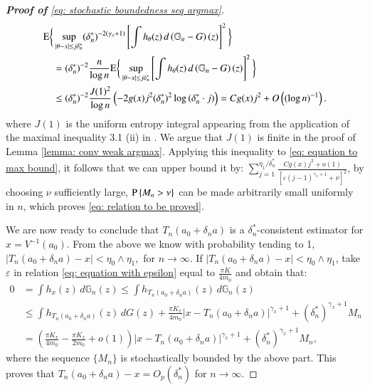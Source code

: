 \begin{proof}[\hypertarget{proof of lemma 3}{\textbf{Proof of}} \eqref{eq: stochastic boundedness seq argmax}]
\begin{align*}
&\mathrm{E} \bigg\{\sup _{|\theta-x| \leq j \delta^*_n} (\delta^*_n)^{-2(\gamma_x+ 1)}\left[\int h_\theta(z) \, d\left(\mathbb{G}_n-G\right)(z)\right]^2\bigg\}  \\
& \quad = (\delta^*_n)^{-2} \frac{n}{\log{n}} \mathrm{E} \bigg\{\sup _{|\theta-x| \leq j \delta^*_n} \left[\int h_\theta(z) \, d\left(\mathbb{G}_n-G\right)(z)\right]^2\bigg\}  \\
& \quad \leq (\delta^*_n)^{-2} \frac{J(1)^2}{\log{n}} \left( -2 g(x) j^2 (\delta^*_n)^2\log{(\delta^*_n \cdot j)}\right) =  C g(x) j^2 + O\left( (\log{n})^{-1} \right).
\end{align*}
where $J(1)$ is the uniform entropy integral appearing from the application of the maximal inequality 3.1 (ii) in \cite{12}. We argue that $J(1)$ is finite in the proof of Lemma \ref{lemma: conv weak argmax}. Applying this inequality to \eqref{eq: equation to max bound}, it follows that we can upper bound it by: $\sum_{j=1}^{\eta_1 / \delta^*_n} \frac{C g(x) j^2 + o(1)}{\left[\varepsilon(j-1)^{\gamma_x+ 1}+\nu\right]^2}$,
by choosing $\nu$ sufficiently large, $\mathrm{P}\left\{M_n>\nu\right\}$ can be made arbitrarily small uniformly in $n$, which proves \eqref{eq: relation to be proved}. 

We are now ready to conclude that $T_n\left(a_0 + \delta_n a \right)$ is a $\delta^*_n$-consistent estimator for $x=V^{-1}\left(a_0\right)$. From the above we know with probability tending to 1, $\left|T_n\left(a_0 + \delta_n a \right)-x\right|<\eta_0 \wedge \eta_1,$
for $n \rightarrow \infty$. If $\left|T_n\left(a_0 + \delta_n a \right)-x\right|<\eta_0 \wedge \eta_1$, take $\varepsilon$ in relation \eqref{eq: equation with epsilon} equal to $\frac{\pi K}{4 m_0}$ and obtain that:
\begin{align*}
0 & =\int h_x(z) \, d \mathbb{G}_n(z) \leq \int h_{T_n\left(a_0 + \delta_n a\right)}(z) \, d \mathbb{G}_n(z) \\
& \leq \int h_{T_n\left(a_0 + \delta_n a \right)}(z) \, d G(z)+\frac{\pi K_x}{4 m_0}\left|x-T_n\left(a_0 + \delta_n a\right)\right|^{\gamma_x+1
} +(\delta^*_n)^{\gamma_x+ 1} M_n \\
& = \left( \frac{\pi K_x}{4 m_0} - \frac{\pi K_x}{2 m_0} + o(1) \right)\left|x-T_n\left(a_0 + \delta_n a \right)\right|^{\gamma_x+1
}+(\delta^*_n)^{\gamma_x+ 1} M_n,
\end{align*}
where the sequence $\{M_n\}$ is stochastically bounded by the above part. This proves that $T_n\left(a_0 + \delta_n a \right)-x=O_p\left(\delta^*_n\right)$ for $n \rightarrow \infty$. 
\end{proof}

